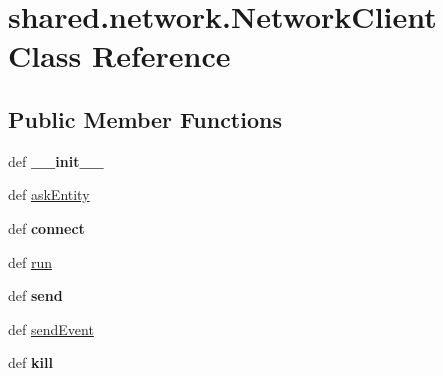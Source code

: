 \hypertarget{classshared_1_1network_1_1_network_client}{\section{shared.\-network.\-Network\-Client \-Class \-Reference}
\label{classshared_1_1network_1_1_network_client}
}
\subsection*{\-Public \-Member \-Functions}
\begin{DoxyCompactItemize}
\item 
\hypertarget{classshared_1_1network_1_1_network_client_a71a07dfbb608f1a23b8017984ed1235b}{def {\bfseries \-\_\-\-\_\-init\-\_\-\-\_\-}}\label{classshared_1_1network_1_1_network_client_a71a07dfbb608f1a23b8017984ed1235b}

\item 
def \hyperlink{classshared_1_1network_1_1_network_client_afd84d7b91550797542814eaa9542d60b}{ask\-Entity}
\item 
\hypertarget{classshared_1_1network_1_1_network_client_aa1c6b4c39c6702a2b118b81e5c77f6f7}{def {\bfseries connect}}\label{classshared_1_1network_1_1_network_client_aa1c6b4c39c6702a2b118b81e5c77f6f7}

\item 
def \hyperlink{classshared_1_1network_1_1_network_client_a68bbd618dc7ad8697b47142d99816570}{run}
\item 
\hypertarget{classshared_1_1network_1_1_network_client_aeded475479adfd60447be4a6de72389f}{def {\bfseries send}}\label{classshared_1_1network_1_1_network_client_aeded475479adfd60447be4a6de72389f}

\item 
def \hyperlink{classshared_1_1network_1_1_network_client_a78d194c7e97afbf18ac808173acbac1b}{send\-Event}
\item 
\hypertarget{classshared_1_1network_1_1_network_client_a6f310c653800b5e6d58c67352fb3823e}{def {\bfseries kill}}\label{classshared_1_1network_1_1_network_client_a6f310c653800b5e6d58c67352fb3823e}

\end{DoxyCompactItemize}
